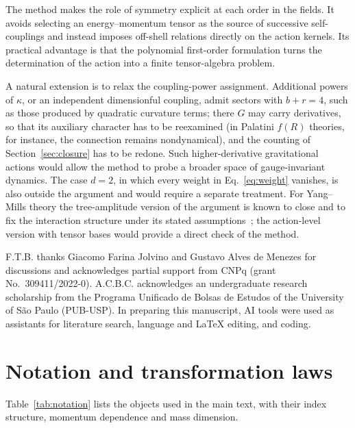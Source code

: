 \documentclass[prd,aps,preprint,nofootinbib,amsmath,amssymb,eqsecnum]{revtex4-2}
\begin{document}
The method makes the role of symmetry explicit at each order in the fields. It avoids
selecting an energy--momentum tensor as the source of successive self-couplings and instead
imposes off-shell relations directly on the action kernels. Its practical advantage is that
the polynomial first-order formulation turns the determination of the action into a finite tensor-algebra
problem.

A natural extension is to relax the coupling-power assignment. Additional powers of
$\kappa$, or an independent dimensionful coupling, admit sectors with $b+r=4$, such as those
produced by quadratic curvature terms; there $G$ may carry derivatives, so that its auxiliary
character has to be reexamined (in Palatini $f(R)$ theories, for instance, the connection
remains nondynamical), and the counting of Section~\ref{sec:closure} has to be redone. Such
higher-derivative gravitational actions would allow the method to probe a broader space of
gauge-invariant dynamics. The case $d=2$, in which every weight in Eq.~\eqref{eq:weight}
vanishes, is also outside the argument and would require a separate treatment. For Yang--Mills theory the tree-amplitude version of the argument
is known to close and to fix the interaction structure under its stated
assumptions~\cite{BrandtFrenkel1996}; the action-level version with tensor bases would
provide a direct check of the method.

\begin{acknowledgments}
F.T.B. thanks Giacomo Farina Jolvino and Gustavo Alves de Menezes for discussions and
acknowledges partial support from CNPq (grant No.~309411/2022-0).
A.C.B.C. acknowledges an undergraduate research scholarship from the Programa Unificado de
Bolsas de Estudos of the University of S\~ao Paulo (PUB-USP).
In preparing this manuscript, AI tools were used as assistants for literature search,
language and LaTeX editing, and coding.
\end{acknowledgments}

\appendix

\section{Notation and transformation laws}
\label{app:transf}

Table~\ref{tab:notation} lists the objects used in the main text, with their index
structure, momentum dependence and mass dimension.
\end{document}
